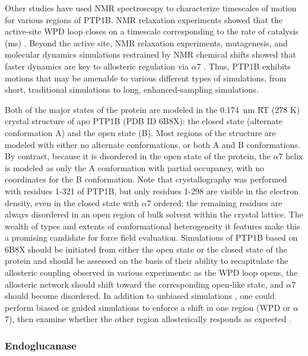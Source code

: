\documentclass[9pt,review]{livecoms}
\begin{document}
Other studies have used NMR spectroscopy to characterize timescales of motion for various regions of PTP1B.
NMR relaxation experiments showed that the active-site WPD loop closes on a timescale corresponding to the rate of catalysis (ms) \cite{whittier_conformational_2013}.
Beyond the active site, NMR relaxation experiments, mutagenesis, and molecular dynamics simulations restrained by NMR chemical shifts showed that faster dynamics are key to allosteric regulation via $\alpha$7 \cite{choy_conformational_2017}.
Thus, PTP1B exhibits motions that may be amenable to various different types of simulations, from short, traditional simulations to long, enhanced-sampling simulations.

Both of the major states of the protein are modeled in the \qty{0.174}{\nano\meter} RT (278 K) crystal structure of apo PTP1B (PDB ID 6B8X): the closed state (alternate conformation A) and the open state (B).
Most regions of the structure are modeled with either no alternate conformations, or both A and B conformations.
By contrast, because it is disordered in the open state of the protein, the $\alpha$7 helix is modeled as only the A conformation with partial occupancy, with no coordinates for the B conformation.
Note that crystallography was performed with residues 1-321 of PTP1B, but only residues 1-298 are visible in the electron density, even in the closed state with $\alpha$7 ordered; the remaining residues are always disordered in an open region of bulk solvent within the crystal lattice.
The wealth of types and extents of conformational heterogeneity it features make this a promising candidate for force field evaluation.
Simulations of PTP1B based on 6B8X should be initiated from either the open state or the closed state of the protein and should be assessed on the basis of their ability to recapitulate the allosteric coupling observed in various experiments: as the WPD loop opens, the allosteric network should shift toward the corresponding open-like state, and $\alpha$7 should become disordered.
In addition to unbiased simulations \cite{yeh_conserved_2023}, one could perform biased or guided simulations to enforce a shift in one region (WPD or $\alpha$7), then examine whether the other region allosterically responds as expected \cite{crean_sequence_2024}.

\subsubsection{Endoglucanase}
\label{sub2:endoglucanase}
\end{document}
